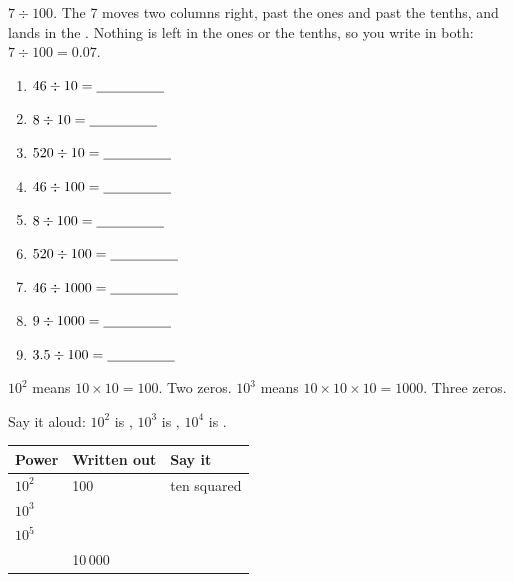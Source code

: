\documentclass[12pt,a4paper]{article}
\begin{document}

\begin{remember}
  $7 \div 100$. The 7 moves two columns right, past the ones and past the tenths,
  and lands in the . Nothing is left in the ones or the tenths, so
  you write  in both: \; $7 \div 100 = \mathbf{0.07}$.
\end{remember}

\vspace{2pt}
\begin{multicols}{3}
\begin{enumerate}[label=(\alph*), itemsep=11pt]
  \item $46 \div 10 = \blank[1.7cm]$
  \item $8 \div 10 = \blank[1.7cm]$
  \item $520 \div 10 = \blank[1.7cm]$
  \item $46 \div 100 = \blank[1.7cm]$
  \item $8 \div 100 = \blank[1.7cm]$
  \item $520 \div 100 = \blank[1.7cm]$
  \item $46 \div 1000 = \blank[1.7cm]$
  \item $9 \div 1000 = \blank[1.7cm]$
  \item $3.5 \div 100 = \blank[1.7cm]$
\end{enumerate}
\end{multicols}


\begin{remember}
  $10^2$ means $10 \times 10 = 100$. Two zeros. \quad
  $10^3$ means $10 \times 10 \times 10 = 1000$. Three zeros.

  \smallskip
  Say it aloud: $10^2$ is , $10^3$ is ,
  $10^4$ is .
\end{remember}

\vspace{2pt}
\noindent
\begin{tabularx}{\textwidth}{|C{2.0cm}|C{2.4cm}|L|}
  \hline
  \textbf{Power} & \textbf{Written out} & \textbf{Say it} \\
  \hline
  $10^2$ \rule[-0.6em]{0pt}{1.9em} & 100 & ten squared \\ \hline
  $10^3$ \rule[-0.6em]{0pt}{1.9em} & & \\ \hline
  $10^5$ \rule[-0.6em]{0pt}{1.9em} & & \\ \hline
  \rule[-0.6em]{0pt}{1.9em} & 10\,000 & \\ \hline
\end{tabularx}
\end{document}
